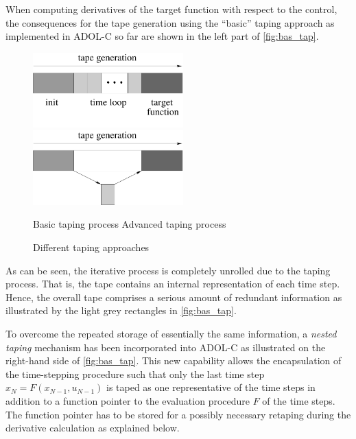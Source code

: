 \documentclass[11pt,twoside]{article}
\begin{document}
When computing derivatives of the target function with respect to the
control, the consequences for the tape generation using the ``basic''
taping approach as implemented in ADOL-C so far are shown in the left part of
\autoref{fig:bas_tap}. 
\begin{figure}[htbp]  
\begin{center}
\hspace*{0.5cm}\includegraphics[width=5.8cm]{tapebasic}\hfill
\includegraphics[width=5.8cm]{tapeadv} \hspace*{0.5cm}\ 
\end{center}
\hspace*{0.8cm} Basic taping process \hspace*{4.3cm} Advanced taping process
\caption{Different taping approaches}
\label{fig:bas_tap}
\end{figure} 
As can be seen, the iterative process is completely
unrolled due to the taping process. That is, the tape contains an internal representation of each 
time step. Hence, the overall tape comprises a serious amount of redundant
information as illustrated by the light grey rectangles in
\autoref{fig:bas_tap}.  

To overcome the repeated storage of essentially the same information, 
a {\em nested taping} mechanism has been incorporated into ADOL-C as illustrated on
the right-hand side of \autoref{fig:bas_tap}. This new
capability allows the encapsulation of the time-stepping procedure
such that only the last time step $x_{N} = F(x_{N-1},u_{N-1})$ is taped as one
representative of the time steps in addition to a function pointer to the 
evaluation procedure $F$ of the time steps.  The function pointer has
to be stored for a possibly necessary retaping during the derivative calculation
as explained below. 
\end{document}
